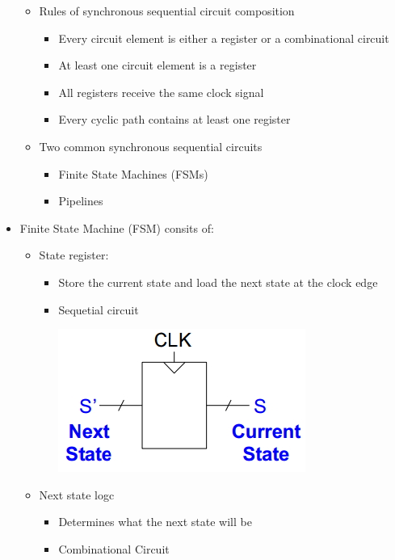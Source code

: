 \documentclass[a4paper]{article}
\begin{document}
\begin{itemize}
\begin{itemize}
\begin{itemize}
					\end{itemize}
				\item Rules of synchronous sequential circuit composition
					\begin{itemize}
						\item Every circuit element is either a register or a combinational circuit
						\item At least one circuit element is a register
						\item All registers receive the same clock signal
						\item Every cyclic path contains at least one register
					\end{itemize}
				\item Two common synchronous sequential circuits
					\begin{itemize}
						\item Finite State Machines (FSMs)
						\item Pipelines
					\end{itemize}
			\end{itemize}
		 \item Finite State Machine (FSM) consits of:
		 	\begin{itemize}
		 		\item State register:
		 			\begin{itemize}
		 				\item Store the current state and load the next state at the clock edge
		 				\item Sequetial circuit\\
		 				\begin{center}
							\includegraphics[scale=1.3]{Figures/FSM-StateRegister.jpg}
						\end{center}
		 			\end{itemize}
		 		\item Next state logc
		 			\begin{itemize}
		 				\item Determines what the next state will be
		 				\item Combinational Circuit\\

\end{itemize}
\end{itemize}
\end{itemize}
\end{document}
